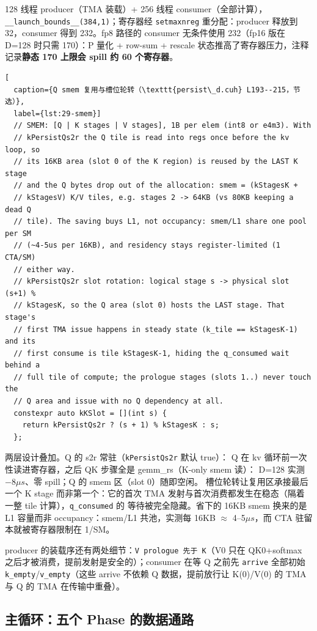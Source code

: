 128 线程 producer（TMA 装载）+ 256 线程 consumer（全部计算），
\texttt{\_\_launch\_bounds\_\_(384,1)}；寄存器经 \texttt{setmaxnreg}
重分配：producer 释放到 32，consumer 得到 232。fp8 路径的 consumer
无条件使用 232（fp16 版在 D=128 时只需 170）：P 量化 + row-sum + rescale
状态推高了寄存器压力，注释记录\textbf{静态 170 上限会 spill 约 60 个寄存器}。

\begin{lstlisting}[
  caption={Q smem 复用与槽位轮转（\texttt{persist\_d.cuh} L193--215，节选）},
  label={lst:29-smem}]
  // SMEM: [Q | K stages | V stages], 1B per elem (int8 or e4m3). With
  // kPersistQs2r the Q tile is read into regs once before the kv loop, so
  // its 16KB area (slot 0 of the K region) is reused by the LAST K stage
  // and the Q bytes drop out of the allocation: smem = (kStagesK +
  // kStagesV) K/V tiles, e.g. stages 2 -> 64KB (vs 80KB keeping a dead Q
  // tile). The saving buys L1, not occupancy: smem/L1 share one pool per SM
  // (~4-5us per 16KB), and residency stays register-limited (1 CTA/SM)
  // either way.
  // kPersistQs2r slot rotation: logical stage s -> physical slot (s+1) %
  // kStagesK, so the Q area (slot 0) hosts the LAST stage. That stage's
  // first TMA issue happens in steady state (k_tile == kStagesK-1) and its
  // first consume is tile kStagesK-1, hiding the q_consumed wait behind a
  // full tile of compute; the prologue stages (slots 1..) never touch the
  // Q area and issue with no Q dependency at all.
  constexpr auto kKSlot = [](int s) {
    return kPersistQs2r ? (s + 1) % kStagesK : s;
  };
\end{lstlisting}

两层设计叠加。Q 的 s2r 常驻（\texttt{kPersistQs2r} 默认 true）：
Q 在 kv 循环前一次性读进寄存器，之后 QK 步骤全是 gemm\_rs（K-only smem 读）：
D=128 实测 $-8\mu s$、零 spill；Q 的 smem 区（slot 0）随即空闲。
槽位轮转让复用区承接最后一个 K stage 而非第一个：它的首次 TMA
发射与首次消费都发生在稳态（隔着一整 tile 计算），\texttt{q\_consumed} 的
等待被完全隐藏。省下的 16KB smem 换来的是 L1 容量而非 occupancy：smem/L1
共池，实测每 16KB $\approx$ 4--5$\mu s$，而 CTA 驻留本就被寄存器限制在
1/SM。

producer 的装载序还有两处细节：\texttt{V prologue 先于 K}（V0 只在
QK0+softmax 之后才被消费，提前发射是安全的）；consumer 在等 Q 之前先
\texttt{arrive} 全部初始 \texttt{k\_empty}/\texttt{v\_empty}（这些 arrive
不依赖 Q 数据，提前放行让 K(0)/V(0) 的 TMA 与 Q 的 TMA 在传输中重叠）。

\subsection{主循环：五个 Phase 的数据通路}


